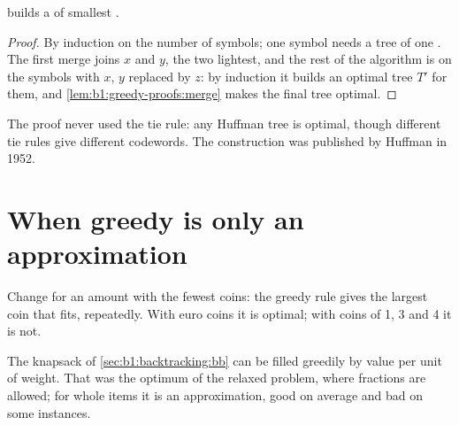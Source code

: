 \begin{theorem}[Huffman]\label{thm:b1:greedy-proofs:huffman}
 builds a  of smallest .
\end{theorem}

\begin{proof}
By induction on the number of symbols; one symbol needs a tree of one . The first merge joins $x$ and $y$, the two
lightest, and the rest of the algorithm is  on the symbols with $x$, $y$ replaced by $z$: by
induction it builds an optimal tree $T'$ for them, and \cref{lem:b1:greedy-proofs:merge} makes the final tree optimal.
\end{proof}

The proof never used the tie rule: any Huffman tree is optimal, though different tie rules give different codewords.
The construction was published by Huffman in 1952.

\section{When greedy is only an approximation}\label{sec:b1:greedy-proofs:approximation}

Change for an amount with the fewest coins: the greedy rule gives the largest coin that fits, repeatedly. With euro
coins it is optimal; with coins of 1, 3 and 4 it is not.

\label{lst:b1:greedy-proofs:coins}

\label{out:b1:greedy-proofs:coins}

The knapsack of \cref{sec:b1:backtracking:bb} can be filled greedily by value per unit of weight. That was the optimum of
the relaxed problem, where fractions are allowed; for whole items it is an approximation, good on average and bad on
some instances.

\label{lst:b1:greedy-proofs:knapsack}

\label{out:b1:greedy-proofs:knapsack}

